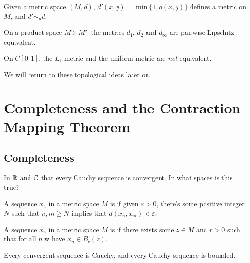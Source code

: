 \documentclass[a4paper]{scrartcl}
\begin{document}
\begin{example}
    Given a metric space $(M, d)$, $d'(x, y) = \min\{1, d(x, y)\}$ defines a metric on $M$, and $d' \sim_u d$.
\end{example}

\begin{example}
    On a product space $M \times M'$, the metrics $d_1$, $d_2$ and $d_{\infty}$ are pairwise Lipschitz equivalent.
\end{example}

\begin{example}
    On $C[0, 1]$, the $L_1$-metric and the uniform metric are \emph{not} equivalent.
\end{example}

We will return to these topological ideas later on.

\section{Completeness and the Contraction Mapping Theorem}

\subsection{Completeness}

In $\mathbb{R}$ and $\mathbb{C}$ that every Cauchy sequence is convergent. In what spaces is this true?

\begin{definition}
    A sequence $x_n$ in a metric space $M$ is  if given $\varepsilon > 0$, there's some positive integer $N$ such that $n, m \geq N$ implies that $d(x_n, x_m) < \varepsilon$.
\end{definition}

\begin{definition}[Bounded]
    A sequence $x_n$ in a metric space $M$ is  if there exists some $z \in M$ and $r > 0$ such that for all $n$ w have $x_n \in B_r(z)$.
\end{definition}

\begin{lemma}
    Every convergent sequence is Cauchy, and every Cauchy sequence is bounded.
\end{lemma}
\end{document}
